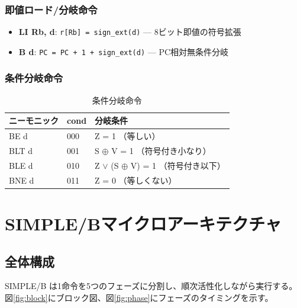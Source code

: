 \documentclass[a4paper,11pt]{ltjsarticle}
\begin{document}
\subsubsection{即値ロード/分岐命令}

\begin{itemize}
\item \textbf{LI Rb, d}: \texttt{r[Rb] = sign\_ext(d)} — 8ビット即値の符号拡張
\item \textbf{B d}: \texttt{PC = PC + 1 + sign\_ext(d)} — PC相対無条件分岐
\end{itemize}

\subsubsection{条件分岐命令}

\begin{table}[h]
\centering
\caption{条件分岐命令}
\label{tab:bcc}
\begin{tabular}{lll}
\toprule
ニーモニック & cond & 分岐条件 \\
\midrule
BE  d & 000 & Z = 1 （等しい） \\
BLT d & 001 & S $\oplus$ V = 1 （符号付き小なり） \\
BLE d & 010 & Z $\vee$ (S $\oplus$ V) = 1 （符号付き以下） \\
BNE d & 011 & Z = 0 （等しくない） \\
\bottomrule
\end{tabular}
\end{table}


\section{SIMPLE/Bマイクロアーキテクチャ}

\subsection{全体構成}

SIMPLE/B は1命令を5つのフェーズに分割し、順次活性化しながら実行する。
図\ref{fig:block}にブロック図、図\ref{fig:phase}にフェーズのタイミングを示す。
\end{document}
